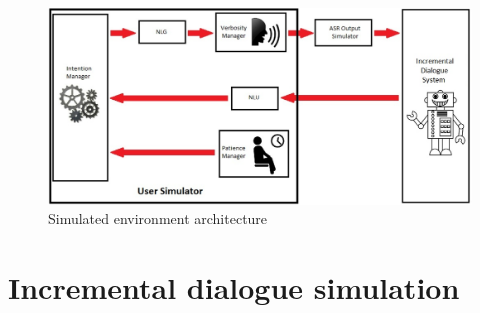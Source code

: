 		\begin{figure}[htb]
			\centering
			\includegraphics[scale=0.45]{figures/SimuSys.jpg}
			\caption{Simulated environment architecture}
			\label{fig:simuoverview}
		\end{figure}
    
\section{Incremental dialogue simulation}
				
        
				

